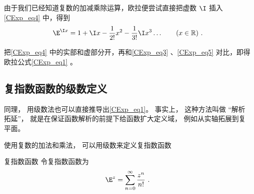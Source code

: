 由于我们已经知道复数的加减乘除运算，欧拉便尝试直接把虚数 $\I$ 插入\autoref{CExp_eq4}  中，得到
\begin{equation}\label{CExp_eq4}
\E^{\I x} =1 + \I x - \frac{1}{2!} x^2 - \frac{1}{3!} \I x^3  \ldots
\qquad (x \in \mathbb R)~.
\end{equation}

把\autoref{CExp_eq4} 中的实部和虚部分开，再和\autoref{CExp_eq3} 、\autoref{CExp_eq5} 对比，即得欧拉公式\autoref{CExp_eq1} 。

\subsection{复指数函数的级数定义}
同理， 用级数法也可以直接推导出\autoref{CExp_eq1}。 事实上， 这种方法叫做 “解析拓延”， 就是在保证函数解析的前提下给函数扩大定义域， 例如从实轴拓展到复平面。

使用复数的加法和乘法， 可以用级数来定义复指数函数
\begin{definition}{复指数函数}
令复指数函数为
\begin{equation}
\E^z = \sum_{n=0}^\infty \frac{z^n}{n!}~.
\end{equation}
\end{definition}

